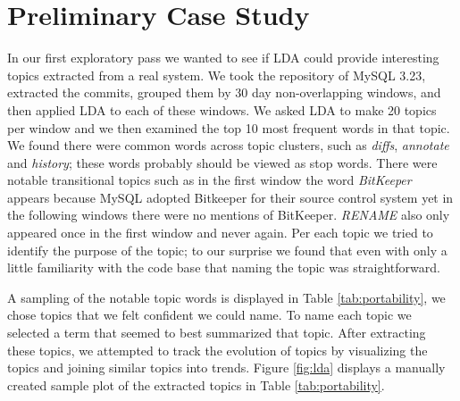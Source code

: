 \documentclass[times, 10pt,twocolumn]{article}
\newcommand{\shrinkit}{\vspace*{-.3em}}
\begin{document}

\shrinkit
\section{Preliminary Case Study}
\shrinkit

In our first exploratory pass we wanted to see if LDA could provide
interesting topics extracted from a real system. We took the
repository of MySQL 3.23, extracted the commits, grouped them by 30
day non-overlapping windows, and then applied LDA to each of these
windows. We asked LDA to make 20 topics per window and we then
examined the top 10 most frequent words in that topic.  We found there
were common words across topic clusters, such as \emph{diffs},
\emph{annotate} and \emph{history}; these words probably should be
viewed as stop words. There were notable transitional topics such as
in the first window the word \emph{BitKeeper} appears because MySQL
adopted Bitkeeper for their source control system yet in the following
windows there were no mentions of BitKeeper. \emph{RENAME} also only
appeared once in the first window and never again. Per each topic we
tried to identify the purpose of the topic; to our surprise we found
that even with only a little familiarity with the code base that
naming the topic was straightforward.

A sampling of the notable topic words is displayed in Table
\ref{tab:portability}, we chose topics that we felt confident we could
name.  To name each topic we selected a term that seemed to best
summarized that topic.  After extracting these topics, we attempted to
track the evolution of topics by visualizing the topics and joining
similar topics into trends.  Figure \ref{fig:lda} displays a manually
created sample plot of the extracted topics in Table
\ref{tab:portability}.
\end{document}

